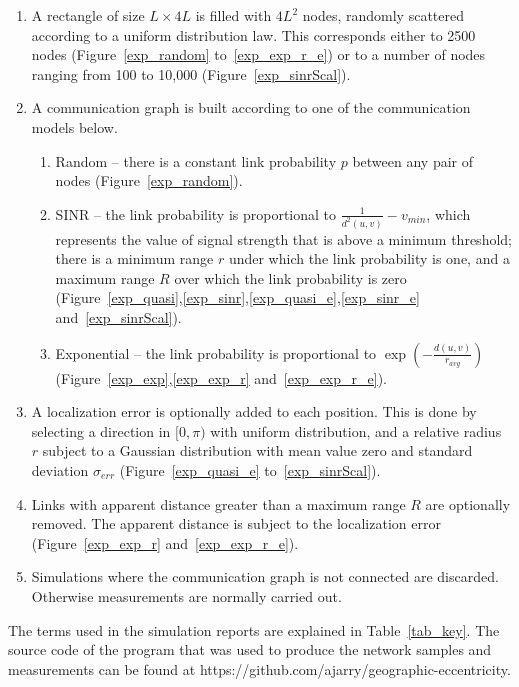\documentclass{article}
\begin{document}
\begin{enumerate}
\item A rectangle of size $L\times 4L$ is filled with $4L^2$ nodes, randomly scattered according to a uniform distribution law. This corresponds either to 2500 nodes (Figure~\ref{exp_random} to~\ref{exp_exp_r_e}) or to a number of nodes ranging from 100 to 10,000 (Figure~\ref{exp_sinrScal}).
\item A communication graph is built according to one of the communication models below.
  \begin{enumerate}
  \item Random -- there is a constant link probability $p$ between any pair of nodes (Figure~\ref{exp_random}).
  \item SINR -- the link probability is proportional to $\frac{1}{d^2(u,v)}-v_{min}$, which represents the value of signal strength that is above a minimum threshold; there is a minimum range $r$ under which the link probability is one, and a maximum range $R$ over which the link probability is zero (Figure~\ref{exp_quasi},\ref{exp_sinr},\ref{exp_quasi_e},\ref{exp_sinr_e} and~\ref{exp_sinrScal}).
  \item Exponential -- the link probability is proportional to $\exp(-\frac{d(u,v)}{r_{avg}})$ (Figure~\ref{exp_exp},\ref{exp_exp_r} and~\ref{exp_exp_r_e}).
  \end{enumerate}
\item A localization error is optionally added to each position. This is done by selecting a direction in $[0,\pi)$ with uniform distribution, and a relative radius $r$ subject to a Gaussian distribution with mean value zero and standard deviation $\sigma_{err}$ (Figure~\ref{exp_quasi_e} to~\ref{exp_sinrScal}).
\item Links with apparent distance greater than a maximum range $R$ are optionally removed. The apparent distance is subject to the localization error (Figure~\ref{exp_exp_r} and~\ref{exp_exp_r_e}).
\item Simulations where the communication graph is not connected are discarded. Otherwise measurements are normally carried out.
\end{enumerate}
The terms used in the simulation reports are explained in Table~\ref{tab_key}. The source code of the program that was used to produce the network samples and measurements can be found at https://github.com/ajarry/geographic-eccentricity.
\end{document}
